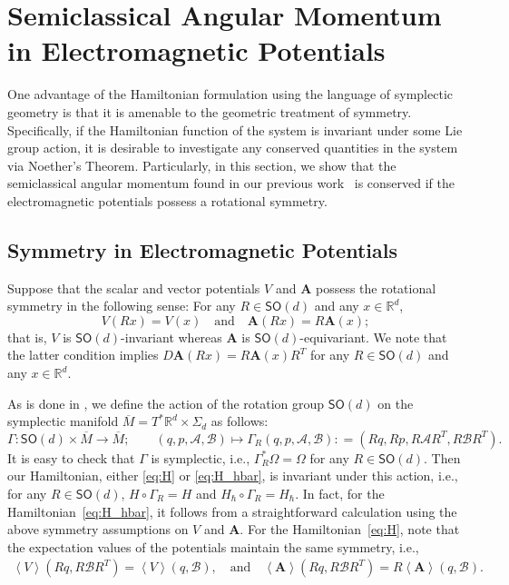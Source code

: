 \documentclass[10pt]{article}
\def\defeq{\mathrel{\mathop:}=}
\newcommand{\vect}[1]{\boldsymbol{#1}}
\begin{document}
\section{Semiclassical Angular Momentum in Electromagnetic Potentials}
\label{sec:angular_momentum}
One advantage of the Hamiltonian formulation using the language of symplectic geometry is that it is amenable to the geometric treatment of symmetry.
Specifically, if the Hamiltonian function of the system is invariant under some Lie group action, it is desirable to investigate any conserved quantities in the system via Noether's Theorem.
Particularly, in this section, we show that the semiclassical angular momentum found in our previous work~\cite{Oh2015b} is conserved if the electromagnetic potentials possess a rotational symmetry.


\subsection{Symmetry in Electromagnetic Potentials}
Suppose that the scalar and vector potentials $V$ and $\vect{A}$ possess the rotational symmetry in the following sense: For any $R \in \mathsf{SO}(d)$ and any $x \in \mathbb{R}^{d}$,
\begin{equation}
  \label{eq:symmetry}
  V(Rx) = V(x)
  \quad\text{and}\quad
  \vect{A}(Rx) = R \vect{A}(x);
\end{equation}
that is, $V$ is $\mathsf{SO}(d)$-invariant whereas $\vect{A}$ is $\mathsf{SO}(d)$-equivariant.
We note that the latter condition implies $D\vect{A}(R x) = R \vect{A}(x) R^{T}$ for any $R \in \mathsf{SO}(d)$ and any $x \in \mathbb{R}^{d}$.

As is done in \cite{Oh2015b}, we define the action of the rotation group $\mathsf{SO}(d)$ on the symplectic manifold $\overline{M} = T^* \mathbb{R}^d \times \Sigma_d$ as follows:
\begin{equation*}
  \Gamma\colon \mathsf{SO}(d)\times \overline{M} \rightarrow \overline{M};
  \qquad
  (q,p,\mathcal{A},\mathcal{B}) \mapsto \Gamma_{R}(q,p,\mathcal{A},\mathcal{B}) \defeq \left(Rq, Rp, R\mathcal{A}R^T, R\mathcal{B}R^T\right).
\end{equation*}
It is easy to check that $\Gamma$ is symplectic, i.e., $\Gamma^*_R \Omega = \Omega$ for any $R \in \mathsf{SO}(d)$.
Then our Hamiltonian, either \eqref{eq:H} or \eqref{eq:H_hbar}, is invariant under this action, i.e., for any $R \in \mathsf{SO}(d)$, $H \circ \Gamma_{R} = H$ and $H_{\hbar} \circ \Gamma_{R} = H_{\hbar}$.
In fact, for the Hamiltonian~\eqref{eq:H_hbar}, it follows from a straightforward calculation using the above symmetry assumptions on $V$ and $\vect{A}$.
For the Hamiltonian~\eqref{eq:H}, note that the expectation values of the potentials maintain the same symmetry, i.e.,
\begin{align*}
  \left\langle V\right\rangle(Rq, R\mathcal{B}R^T) = \left\langle V\right\rangle(q,\mathcal{B}),
  \quad\text{and}\quad
  \left\langle \vect{A}\right\rangle(Rq, R\mathcal{B}R^T) = R \left\langle \vect{A}\right\rangle(q,\mathcal{B}).
\end{align*}
\end{document}
